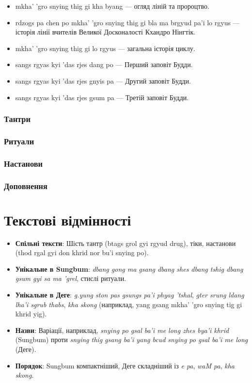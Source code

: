 \documentclass{article}
\begin{document}
\begin{itemize}
\item mkha' 'gro snying thig gi kha byang --- огляд ліній та пророцтво.
\item rdzogs pa chen po mkha' 'gro snying thig gi bla ma brgyud pa'i lo rgyus --- історія лінії вчителів Великої Досконалості Кхандро Нінгтік.
\item mkha' 'gro snying thig gi lo rgyus --- загальна історія циклу.
\item sangs rgyas kyi 'das rjes dang po --- Перший заповіт Будди.
\item sangs rgyas kyi 'das rjes gnyis pa --- Другий заповіт Будди.
\item sangs rgyas kyi 'das rjes gsum pa --- Третій заповіт Будди.
\end{itemize}

\subsubsection{Тантри}
\subsubsection{Ритуали}
\subsubsection{Настанови}
\subsubsection{Доповнення}

\section{Текстові відмінності}
\begin{itemize}
    \item \textbf{Спільні тексти}: Шість тантр (btags grol gyi rgyud drug), тіки, настанови (thod rgal gyi don khrid nor bu'i snying po).
    \item \textbf{Унікальне в Sungbum}: \textit{dbang gong ma gsang dbang shes dbang tshig dbang gsum gyi sa ma 'grel}, стислі ритуали.
    \item \textbf{Унікальне в Деге}: \textit{g.yung ston pas gsungs pa'i phyag 'tshal}, \textit{gter srung ldang lha'i sgrub thabs}, \textit{kha skong} (наприклад, yang gsang mkha' 'gro snying tig gi khrid yig).
    \item \textbf{Назви}: Варіації, наприклад, \textit{snying po gsal ba'i me long zhes bya'i khrid} (Sungbum) проти \textit{snying thig gsang ba'i yang bcud snying po gsal ba'i me long} (Деге).
    \item \textbf{Порядок}: Sungbum компактніший, Деге складніший із \textit{e pa}, \textit{waM pa}, \textit{kha skong}.
\end{itemize}
\end{document}
